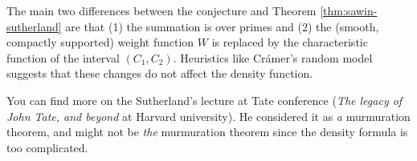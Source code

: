The main two differences between the conjecture and Theorem \ref{thm:sawin-sutherland} are that (1) the summation is over primes and (2) the (smooth, compactly supported) weight function $W$ is replaced by the characteristic function of the interval $(C_1, C_2)$.
Heuristics like Cr\'amer's random model suggests that these changes do not affect the density function.

You can find more on the Sutherland's lecture \cite{sutherland} at Tate conference (\emph{The legacy of John Tate, and beyond} at Harvard university).
He considered it as \emph{a} murmuration theorem, and might not be \emph{the} murmuration theorem since the density formula is too complicated.